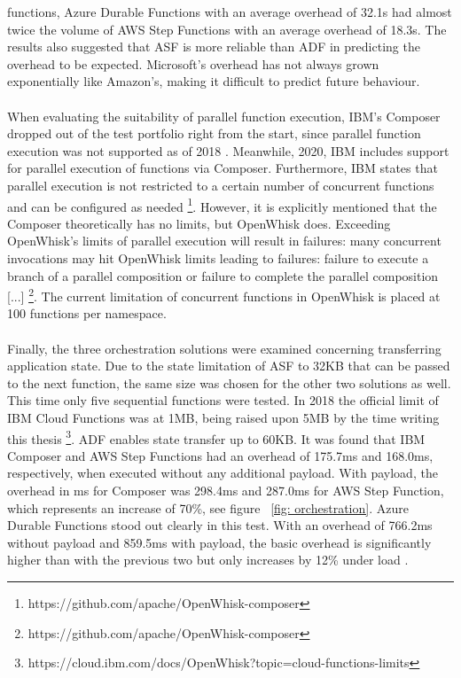 \documentclass[a4paper,twoside,11pt, pagesize]{scrartcl}
\begin{document}
functions, Azure Durable Functions with an average overhead of 32.1s had almost twice the volume of AWS Step Functions with an average overhead of 18.3s. The results also suggested that ASF is more reliable than ADF in predicting the overhead to be expected. Microsoft's overhead has not always grown exponentially like Amazon's, making it difficult to predict future behaviour.\\\\ When evaluating the suitability of parallel function execution, IBM's Composer dropped out of the test portfolio right from the start, since parallel function execution was not supported as of 2018 \cite{lopez2018comparison}. Meanwhile, 2020, IBM includes support for parallel execution of functions via Composer. Furthermore, IBM states that parallel execution is not restricted to a certain number of concurrent functions and can be configured as needed \footnote{https://github.com/apache/OpenWhisk-composer }. However, it is explicitly mentioned that the Composer theoretically has no limits, but OpenWhisk does. Exceeding OpenWhisk's limits of parallel execution will result in failures: \glqq[...] many concurrent invocations may hit OpenWhisk limits leading to failures: failure to execute a branch of a parallel composition or failure to complete the parallel composition [...]\grqq{} \footnote{https://github.com/apache/OpenWhisk-composer}. The current limitation of concurrent functions in OpenWhisk is placed at 100 functions per namespace.\\\\ Finally, the three orchestration solutions were examined concerning transferring application state. Due to the state limitation of ASF to 32KB that can be passed to the next function, the same size was chosen for the other two solutions as well. This time only five sequential functions were tested. In 2018 the official limit of IBM Cloud Functions was at 1MB, being raised upon 5MB by the time writing this thesis \footnote{https://cloud.ibm.com/docs/OpenWhisk?topic=cloud-functions-limits}. ADF enables state transfer up to 60KB. It was found that IBM Composer and AWS Step Functions had an overhead of 175.7ms and 168.0ms, respectively,  when executed without any additional payload. With payload, the overhead in ms for Composer was 298.4ms and 287.0ms for AWS Step Function, which represents an increase of 70\%, see figure ~\ref{fig: orchestration}. Azure Durable Functions stood out clearly in this test. With an overhead of 766.2ms without payload and 859.5ms with payload, the basic overhead is significantly higher than with the previous two but only increases by 12\% under load \cite{lopez2018comparison}.
\end{document}
